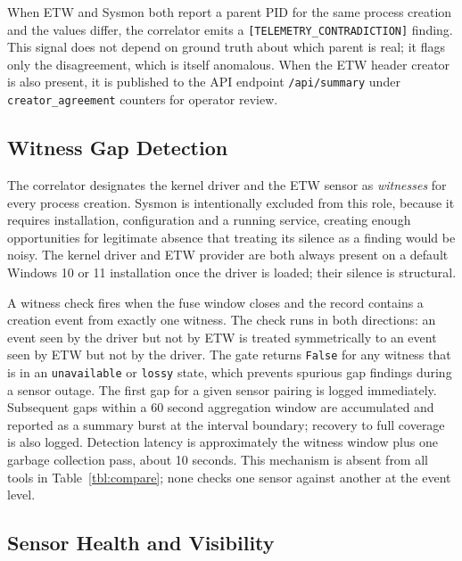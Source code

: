 \documentclass[10pt,twocolumn,letterpaper]{article}
\newcommand{\code}[1]{\texttt{\small #1}}
\begin{document}
When ETW and Sysmon both report a parent PID for the same process creation and the values
differ, the correlator emits a \code{[TELEMETRY\_CONTRADICTION]} finding. This signal
does not depend on ground truth about which parent is real; it flags only the
disagreement, which is itself anomalous. When the ETW header creator is also present, it
is published to the API endpoint \code{/api/summary} under \code{creator\_agreement}
counters for operator review.

\subsection{Witness Gap Detection}
\label{sec:witness}

The correlator designates the kernel driver and the ETW sensor as \emph{witnesses} for
every process creation. Sysmon is intentionally excluded from this role, because
it requires installation, configuration and a running service, creating enough
opportunities for legitimate absence that treating its silence as a finding would be
noisy. The kernel driver and ETW provider are both always present on a default Windows 10
or 11 installation once the driver is loaded; their silence is structural.

A witness check fires when the fuse window closes and the record contains a creation
event from exactly one witness. The check runs in both directions: an event seen by the
driver but not by ETW is treated symmetrically to an event seen by ETW but not by the
driver. The gate returns \code{False} for any witness that is in an \code{unavailable} or
\code{lossy} state, which prevents spurious gap findings during a sensor outage. The
first gap for a given sensor pairing is logged immediately. Subsequent gaps within a 60
second aggregation window are accumulated and reported as a summary burst at the interval
boundary; recovery to full coverage is also logged. Detection latency is approximately
the witness window plus one garbage collection pass, about 10 seconds. This mechanism is
absent from all tools in Table~\ref{tbl:compare}; none checks one sensor against another
at the event level.

\subsection{Sensor Health and Visibility}
\label{sec:health}
\end{document}
